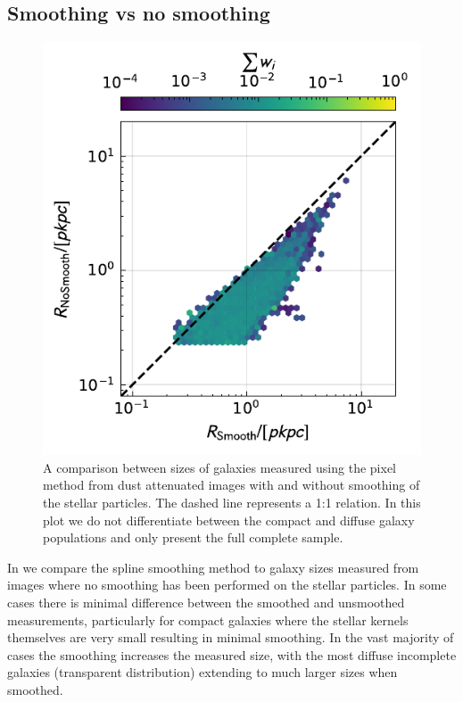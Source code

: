 \subsection{Smoothing vs no smoothing}


\begin{figure}
	\includegraphics[width=\columnwidth]{Figures/ComparisonHalfLightRadiusSmoothing_FAKE.TH.FUV_5.0_sim_Total_default.pdf}
    \caption{A comparison between sizes of galaxies measured using the pixel method from dust attenuated images with and without smoothing of the stellar particles. The dashed line represents a 1:1 relation. In this plot we do not differentiate between the compact and diffuse galaxy populations and only present the full complete sample.}
    \label{fig:nosmooth}
\end{figure}

In  we compare the spline smoothing method to galaxy sizes measured from images where no smoothing has been performed on the stellar particles. In some cases there is minimal difference between the smoothed and unsmoothed measurements, particularly for compact galaxies where the stellar kernels themselves are very small resulting in minimal smoothing. In the vast majority of cases the smoothing increases the measured size, with the most diffuse incomplete galaxies (transparent distribution) extending to much larger sizes when smoothed.

